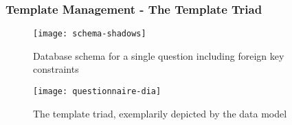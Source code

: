     \subsubsection{Template Management - The Template Triad}
    \label{section:implementation:template-triad}
        \begin{figure}
            \centering
            \texttt{[image: schema-shadows]}
            \caption{Database schema for a single question including foreign key constraints}
            \label{fig:schema-shadows}
        \end{figure}
        \begin{figure}
            \centering
            \texttt{[image: questionnaire-dia]}
            \caption{The template triad, exemplarily depicted by the  data model}
            \label{fig:questionnaire-dia}
        \end{figure}

